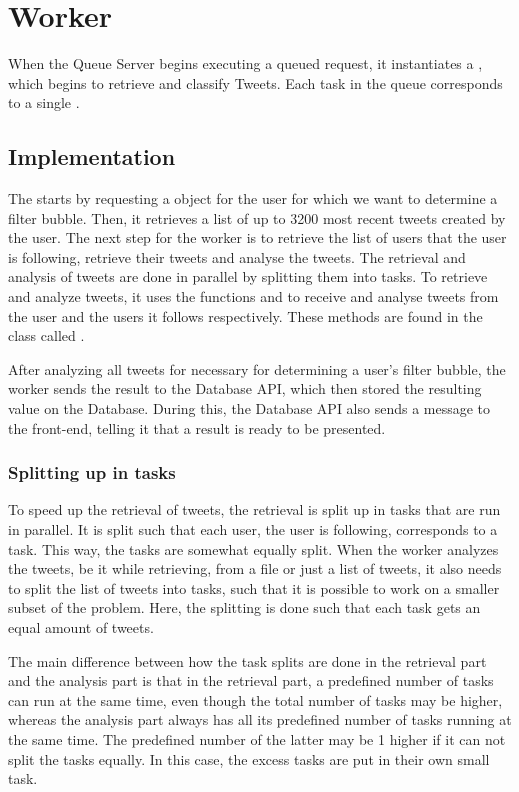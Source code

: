 \chapter{Worker}\label{workerLabel}
When the Queue Server begins executing a queued request, it instantiates a
, which begins to retrieve and classify Tweets. Each task in the
queue corresponds to a single .

\section{Implementation}
The  starts by requesting a  object for the user for
which we want to determine a filter bubble. Then, it retrieves a list of up to
3200 most recent tweets created by the user. The next step for the worker is to
retrieve the list of users that the user is following, retrieve their tweets and
analyse the tweets. The retrieval and analysis of tweets are done in parallel by
splitting them into tasks. To retrieve and analyze tweets, it uses the functions
 and 
to receive and analyse tweets from the user and the users it follows
respectively. These methods are found in the class called
.\nl

After analyzing all tweets for necessary for determining a user's filter bubble,
the worker sends the result to the Database API, which then stored the resulting
value on the Database. During this, the Database API also sends a message to the
front-end, telling it that a result is ready to be presented.

\subsection{Splitting up in tasks}\label{sec:taskSplit}
To speed up the retrieval of tweets, the retrieval is split up in tasks that are
run in parallel. It is split such that each user, the user is following,
corresponds to a task. This way, the tasks are somewhat equally split.
When the worker analyzes the tweets, be it while retrieving, from a file or just
a list of tweets, it also needs to split the list of tweets into tasks, such
that it is possible to work on a smaller subset of the problem. Here, the
splitting is done such that each task gets an equal amount of tweets.

The main difference between how the task splits are done in the retrieval
part and the analysis part is that in the retrieval part, a predefined number
of tasks can run at the same time, even though the total number of tasks may be
higher, whereas the analysis part always has all its predefined number of tasks
running at the same time. The predefined number of the latter may be 1 higher if
it can not split the tasks equally. In this case, the excess tasks are put in
their own small task.

